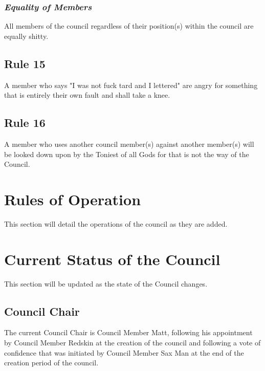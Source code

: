 \documentclass[]{article}
\begin{document}
\subsubsection{\textit{Equality of Members}}
All members of the council regardless of their position(s) within the council are equally shitty. 

\subsection{Rule 15}
A member who says "I was not fuck tard and I lettered" are angry for something that is entirely their own fault and shall take a knee.

\subsection{Rule 16}
A member who uses another council member(s) against another member(s) will be looked down upon by the Toniest of all Gods for that is not the way of the Council.

\newpage
\section{Rules of Operation}
\label{sec:rulesOperation}
This section will detail the operations of the council as they are added.

\newpage
\section{Current Status of the Council}
\label{sec:status}
This section will be updated as the state of the Council changes.

\subsection{Council Chair}
The current Council Chair is Council Member Matt, following his appointment by Council Member Redskin at the creation of the council and following a vote of confidence that was initiated by Council Member Sax Man at the end of the creation period of the council.
\end{document}
